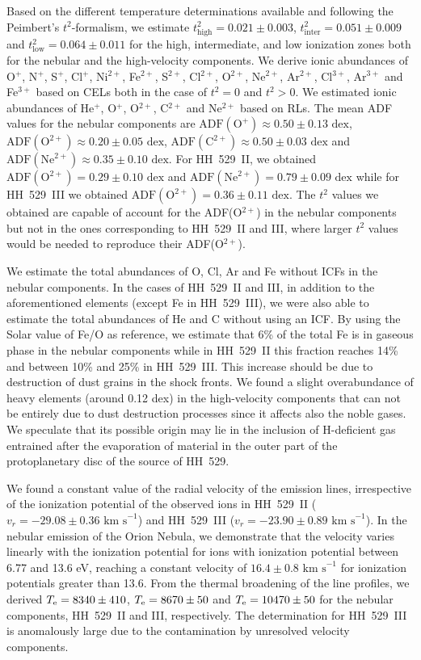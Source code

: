 \documentclass[fleqn,usenatbib]{mnras}
\begin{document}
Based on the different temperature determinations available  and following the Peimbert's $t^2$-formalism, we estimate $t^2_\text{high}=0.021 \pm 0.003$, $t^2_\text{inter}=0.051 \pm 0.009$ and $t^2_\text{low}=0.064 \pm 0.011$ for the high, intermediate, and low ionization zones both for the nebular and the high-velocity components. We derive ionic abundances of O$^{+}$, N$^{+}$, S$^{+}$, Cl$^{+}$, Ni$^{2+}$, Fe$^{2+}$, S$^{2+}$, Cl$^{2+}$, O$^{2+}$, Ne$^{2+}$, Ar$^{2+}$, Cl$^{3+}$, Ar$^{3+}$ and Fe$^{3+}$ based on CELs both in the case of $t^2=0$ and $t^2>0$. We estimated ionic abundances of He$^{+}$, O$^{+}$, O$^{2+}$, C$^{2+}$ and Ne$^{2+}$ based on RLs. The mean ADF values for the nebular components are $\text{ADF}(\text{O}^{+})\approx 0.50 \pm 0.13 \text{ dex}$, $\text{ADF}(\text{O}^{2+})\approx 0.20 \pm 0.05 \text{ dex}$, $\text{ADF}(\text{C}^{2+})\approx 0.50 \pm 0.03 \text{ dex}$ and $\text{ADF}(\text{Ne}^{2+})\approx 0.35 \pm 0.10 \text{ dex}$. For HH~529~II, we obtained $\text{ADF}(\text{O}^{2+})= 0.29 \pm 0.10 \text{ dex}$ and $\text{ADF}(\text{Ne}^{2+})= 0.79 \pm 0.09 \text{ dex}$ while for HH~529~III we obtained $\text{ADF}(\text{O}^{2+})= 0.36 \pm 0.11 \text{ dex}$. The $t^2$ values we obtained are capable of account for the ADF(O$^{2+}$) in the nebular components but not in the ones corresponding to HH~529~II and III, where larger $t^2$ values would be needed to reproduce their ADF(O$^{2+}$). 

We estimate the total abundances of O, Cl, Ar and Fe without ICFs in the nebular components. 
In the cases of HH~529~II and III, in addition to the aforementioned elements (except Fe in HH~529~III), we were also able to estimate the total abundances of He and C without using an ICF. By using the Solar value of Fe/O as reference, we estimate that 6\% of the total Fe is in gaseous phase in the nebular components while in HH~529~II this fraction reaches 14\% and between 10\% and 25\% in HH~529~III. This increase should be due to destruction of dust grains in the shock fronts. We found a slight overabundance of heavy elements (around 0.12 dex) in the high-velocity components that can not be entirely due to dust destruction processes since it affects also the noble gases. We speculate that its possible origin may lie in the inclusion of H-deficient gas entrained after the evaporation of material in the outer part of the protoplanetary disc of the source of HH~529. 

We found a constant value of the radial velocity of the emission lines, irrespective of the ionization potential of the observed ions in HH~529~II ($v_r=-29.08 \pm 0.36 \text{ km s}^{-1}$) and HH~529~III ($v_r=-23.90 \pm 0.89 \text{ km s}^{-1}$). In the nebular emission of the Orion Nebula, we demonstrate that the velocity varies linearly with the ionization potential for ions with ionization potential between 6.77 and 13.6 eV, reaching a constant velocity of $16.4 \pm 0.8 \text{ km s}^{-1}$ for ionization potentials greater than 13.6. From the thermal broadening of the line profiles, we derived $T_{\rm e}=8340 \pm 410$, $T_{\rm e}=8670 \pm 50$ and $T_{\rm e}=10470 \pm 50$ for the nebular components, HH~529~II and III, respectively. The determination for HH~529~III is anomalously large due to the contamination by unresolved velocity components.
\end{document}
